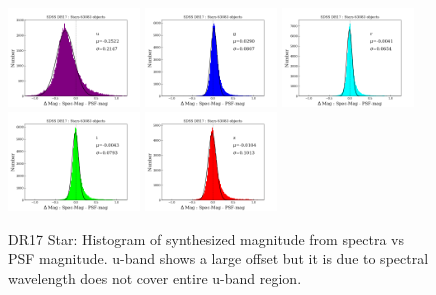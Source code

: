\documentclass[apj,twocolumn]{aastex631}
\begin{document}
\begin{figure}%
\begin{center}
\includegraphics[angle=0,width=3.5cm]{figures/20220811_dmag_histogram_u_dr17stars.png}
\includegraphics[angle=0,width=3.5cm]{figures/20220811_dmag_histogram_g_dr17stars.png}
\includegraphics[angle=0,width=3.5cm]{figures/20220811_dmag_histogram_r_dr17stars.png}
\includegraphics[angle=0,width=3.5cm]{figures/20220811_dmag_histogram_i_dr17stars.png}
\includegraphics[angle=0,width=3.5cm]{figures/20220811_dmag_histogram_z_dr17stars.png}
\caption{DR17 Star: Histogram of synthesized magnitude from spectra vs PSF magnitude.
u-band shows a large offset but it is due to spectral wavelength does not cover entire u-band region.}
\end{center}
\end{figure}
\end{document}
